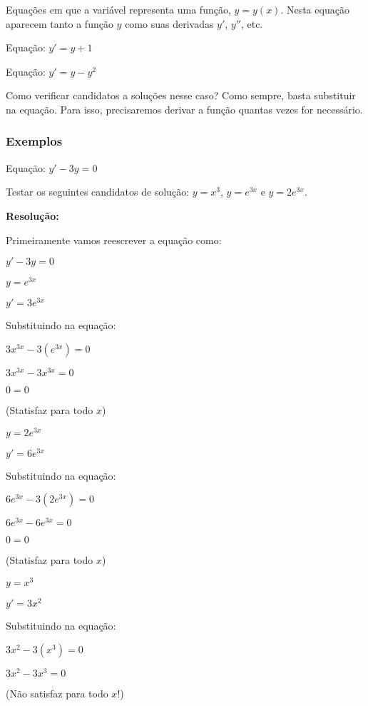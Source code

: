 \documentclass[a4paper]{article}
\begin{document}
Equações em que a variável representa uma função, $y=y(x)$. Nesta
equação aparecem tanto a função $y$ como suas derivadas $y'$, $y''$,
etc.

Equação: $y' = y + 1$

Equação: $y' = y-y^2$

Como verificar candidatos a soluções nesse caso? Como sempre, basta
substituir na equação. Para isso, precisaremos derivar a função
quantas vezes for necessário.

\subsubsection{Exemplos}

Equação: $y' - 3y = 0$

Testar os seguintes candidatos de solução: $y=x^3$, $y=e^{3x}$ e $y=2e^{3x}$.



{\bf Resolução:}

Primeiramente vamos reescrever a equação como:

$y' - 3y = 0$

\begin{multicols}{3}

$y=e^{3x}$

$y' = 3e^{3x}$

Substituindo na equação:

$3x^{3x} - 3(e^{3x}) = 0$

$3x^{3x} - 3x^{3x} =0$

$0=0$

(Statisfaz para todo $x$)

\columnbreak

$y=2e^{3x}$

$y' = 6e^{3x}$

Substituindo na equação:

$6e^{3x} - 3(2e^{3x}) = 0$

$6e^{3x} - 6e^{3x} =0$

$0=0$

(Statisfaz para todo $x$)

\columnbreak

$y=x^3$

$y' = 3x^2$

Substituindo na equação:

$3x^2 - 3(x^3) =0 $

$3x^2 - 3x^3 =0 $

(Não satisfaz para todo $x$!)

\end{multicols}



\end{document}
